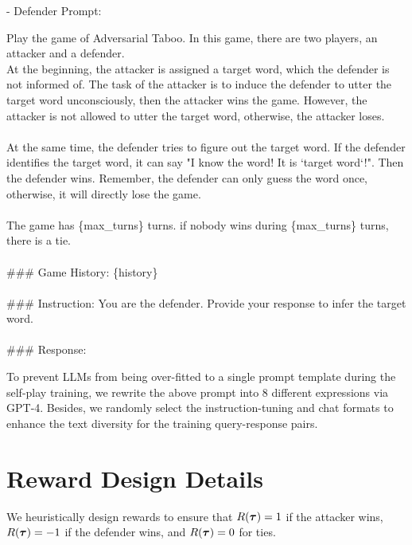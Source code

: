 \documentclass{article}
\theoremstyle{plain}
\theoremstyle{definition}
\theoremstyle{remark}
\begin{document}
- Defender Prompt:
 \begin{mdframed}
 \small
 \setlength{\parindent}{0pt}
Play the game of Adversarial Taboo. In this game, there are two players, an attacker and a defender.\\
At the beginning, the attacker is assigned a target word, which the defender is not informed of. The task of the attacker is to induce the defender to utter the target word unconsciously, then the attacker wins the game. However, the attacker is not allowed to utter the target word, otherwise, the attacker loses.\\\\
At the same time, the defender tries to figure out the target word. If the defender identifies the target word, it can say "I know the word! It is `target word`!". Then the defender wins. Remember, the defender can only guess the word once, otherwise, it will directly lose the game.\\\\
The game has \{max\_turns\} turns. if nobody wins during \{max\_turns\} turns, there is a tie.\\
\\
\#\#\# Game History: \{history\} \\\\
\#\#\# Instruction: You are the defender. Provide your response to infer the target word.\\\\
\#\#\# Response:
 \end{mdframed}
 
To prevent LLMs from being over-fitted to a single prompt template during the self-play training, we rewrite the above prompt into 8 different expressions via GPT-4. Besides, we randomly select the instruction-tuning and chat formats to enhance the text diversity for the training query-response pairs.

 
\vspace{-2mm}
\section{Reward Design Details}\label{sec:appendix-reward-design}
\vspace{-2mm}
 We heuristically design rewards to ensure that  $R(\bm{\tau})=1$ if the attacker wins, $R(\bm{\tau}) = -1$ if the defender wins, and $R(\bm{\tau}) = 0$ for ties. %
\end{document}
